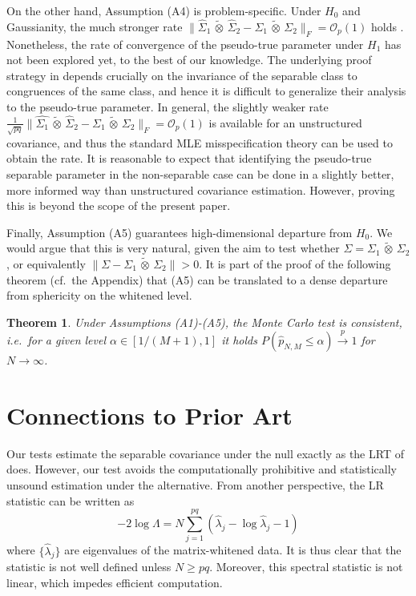 \documentclass[12pt]{article}
\newcommand{\ot}{\,\tilde\otimes\,}
\newtheorem{theorem}{Theorem}
\begin{document}
On the other hand, Assumption (A4) is problem-specific. Under $H_0$ and Gaussianity, the much stronger rate $\|\widehat{\Sigma}_1\ot\widehat{\Sigma}_2 - \Sigma_1 \ot \Sigma_2 \|_F= \mathcal{O}_p(1)$ holds \citep{franks2026near}. Nonetheless, the rate of convergence of the pseudo-true parameter under $H_1$ has not been explored yet, to the best of our knowledge. The underlying proof strategy in \citet{franks2026near} depends crucially on the invariance of the separable class to congruences of the same class, and hence it is difficult to generalize their analysis to the pseudo-true parameter. In general, the slightly weaker rate $\frac{1}{\sqrt{pq}}\|\widehat{\Sigma_1}\ot\widehat{\Sigma}_2 - \Sigma_1 \ot \Sigma_2 \|_F=\mathcal{O}_p(1)$ is available for an unstructured covariance, and thus the standard MLE misspecification theory \citep{white1982maximum} can be used to obtain the rate. It is reasonable to expect that identifying the pseudo-true separable parameter in the non-separable case can be done in a slightly better, more informed way than unstructured covariance estimation. However, proving this is beyond the scope of the present paper. 


Finally, Assumption (A5) guarantees high-dimensional departure from $H_0$. We would argue that this is very natural, given the aim to test whether $\Sigma=\Sigma_1 \ot \Sigma_2$, or equivalently $\|\Sigma-\Sigma_1 \ot \Sigma_2\| > 0$. It is part of the proof of the following theorem (cf.~the Appendix) that (A5) can be translated to a dense departure from sphericity on the whitened level.

\begin{theorem}\label{thm:consistency}
    Under Assumptions (A1)-(A5), the Monte Carlo test is consistent, i.e.~for a given level $\alpha \in [1/(M+1),1]$ it holds $P(\widehat{p}_{N,M} \leq \alpha) \stackrel{p}{\to} 1$ for $N \to \infty$.
\end{theorem}

\section{Connections to Prior Art}\label{sec:art}

Our tests estimate the separable covariance under the null exactly as the LRT of \citet{MITCHELL2006} does.
However, our test avoids the computationally prohibitive and statistically unsound estimation under the alternative. From another perspective, the LR statistic can be written as
\[
-2 \log\Lambda = N\sum_{j=1}^{pq}(\widehat\lambda_j - \log \widehat\lambda_j - 1)
\]
where $\{\widehat\lambda_j\}$ are eigenvalues of the matrix-whitened data. It is thus clear that the statistic is not well defined unless $N \geq pq$. Moreover, this spectral statistic is not linear, which impedes efficient computation.
\end{document}
